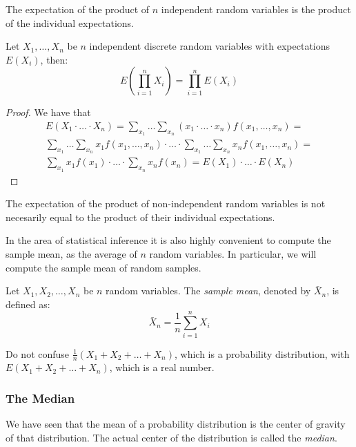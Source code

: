 The expectation of the product of $n$ independent random variables is the product of the individual expectations.

\begin{proposition}
Let $X_{1}, \ldots, X_{n}$ be $n$ independent discrete random variables with expectations $E\left(X_{i}\right)$, then:
\[
E\left(\prod_{i=1}^{n}X_{i}\right)=\prod_{i=1}^{n}E\left(X_{i}\right)
\]
\end{proposition}
\begin{proof}
We have that
\begin{multline}
E \left(X_1  \cdot \ldots \cdot X_n  \right) = 
\sum_{x_1} \ldots \sum_{x_n} \left(x_1 \cdot \ldots \cdot x_n  \right) f\left(x_1, \ldots, x_n \right) = \\
\sum_{x_1} \ldots \sum_{x_n} x_1 f\left(x_1, \ldots, x_n \right) \cdot \ldots \cdot \sum_{x_1} \ldots \sum_{x_n} x_n f\left(x_1, \ldots, x_n \right) = \\
\sum_{x_1} x_1 f\left(x_1\right) \cdot \ldots \cdot \sum_{x_n} x_n f\left( x_n \right) = 
E \left( X_1 \right) \cdot \ldots \cdot E \left( X_n \right)
\end{multline}
\end{proof}

The expectation of the product of non-independent random variables is not necesarily equal to the product of their individual expectations.

In the area of statistical inference it is also highly convenient to compute the sample mean, as the average of $n$ random variables. In particular, we will compute the sample mean of random samples.

\begin{definition}
Let $X_1, X_2, \ldots, X_n$ be $n$ random variables. The \emph{sample mean}, denoted by $\bar{X}_n$, is defined as:
\[
\bar{X}_n = \frac{1}{n} \sum_{i=1}^n X_i
\]
\end{definition}

Do not confuse $\frac{1}{n} \left( X_1 + X_2 + \ldots + X_n \right)$, which is a probability distribution, with $E \left( X_1 + X_2 + \ldots + X_n \right)$, which is a real number.


\subsubsection*{The Median}


We have seen that the mean of a probability distribution is the center of gravity of that distribution. The actual center of the distribution is called  the \emph{median}.

